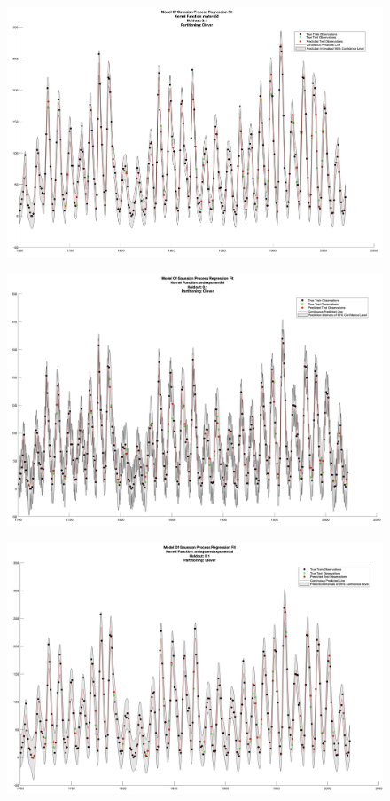 \documentclass[12pt,a4paper]{article}
\begin{document}
\newpage

\begin{figure}[H]
	\centering
	\includegraphics[scale = 0.2]{Matern52.jpg}
\end{figure}

\vspace{3cm}

\begin{figure}[H]
	\centering
	\includegraphics[scale = 0.2]{Ard_Exponential.jpg}
\end{figure}

\newpage

\begin{figure}[H]
	\centering
	\includegraphics[scale = 0.2]{Ard_Squared_Exponential.jpg}
\end{figure}
\end{document}
